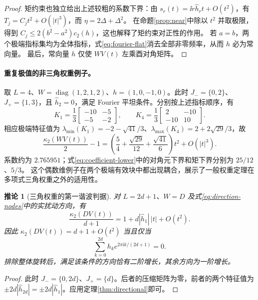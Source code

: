 \documentclass[UTF8,a4paper,zihao=-4,fontset=windows]{ctexart}
\theoremstyle{chinese}
\newtheorem{corollary}[theorem]{推论}
\numberwithin{equation}{section}
\newcommand{\diag}{\operatorname{diag}}
\newcommand{\cond}{\kappa_2}
\begin{document}
\begin{proof}
矩约束也独立给出上述较粗的系数下界：由 $s_r(t)=\ii r\widehat h_rt+O(t^2)$，有 $T_j=C_jt^2+O(|t|^3)$，而 $\eta=2\Delta+\Delta^2$。
在命题\ref{prop:near}中除以 $t^2$ 并取极限，得到 $C_j\le2(b^2-a^2)c_2(h)$，这也解释了矩约束对正性的作用。
若 $a=b$，两个极端指标集均为全体指标，式\eqref{eq:fourier-flat}消去全部非零频率，从而 $h$ 必为常向量。
最后，常向量 $h$ 仅使 $WV(t)$ 左乘酉对角矩阵。
\end{proof}


\paragraph{重复极值的非三角权重例子。}
取 $L=4$、$W=\diag(1,2,1,2)$、$h=(1,0,-1,0)$。此时 $J_-=\{0,2\}$、$J_+=\{1,3\}$，且 $\widehat h_2=0$，满足 Fourier 平坦条件。分别按上述指标顺序，有
\[
K_1=\frac13\begin{bmatrix}-10&-5\\-5&-2\end{bmatrix},\qquad
K_4=\frac13\begin{bmatrix}2&-10\\-10&10\end{bmatrix}.
\]
相应极端特征值为 $\lambda_{\min}(K_1)=-2-\sqrt{41}/3$、$\lambda_{\max}(K_4)=2+2\sqrt{29}/3$，故
\[
\frac{\cond(WV(t))}{2}-1=
\left(\frac54+\frac{\sqrt{29}}{12}+\frac{\sqrt{41}}6\right)t^2+O(|t|^3).
\]
系数约为 $2.765951$；式\eqref{eq:coefficient-lower}中的对角元下界和矩下界分别为 $25/12$、$5/3$。
这个偶数维例子在两个极端有效块中都出现耦合，展示了一般权重定理在多项式三角权重之外的适用性。

\begin{corollary}[三角权重的第一谐波判据]\label{cor:first-harmonic}
对 $L=2d+1$、$W=D$ 及式\eqref{eq:direction-nodes}中的实扰动方向，有
\begin{equation}\label{eq:first-harmonic}
\frac{\cond(DV(t))}{d+1}
=1+d|\widehat h_1|\,|t|+O(t^2).
\end{equation}
因此 $\cond(DV(t))=d+1+O(t^2)$ 当且仅当
\begin{equation}\label{eq:harmonic-criterion}
\sum_{k=0}^{2d}h_k e^{2\pi\mathrm i k/(2d+1)}=0.
\end{equation}
排除整体旋转后，满足该条件的方向恰有二阶增长，其余方向为一阶增长。
\end{corollary}
\begin{proof}
此时 $J_-=\{0,2d\}$、$J_+=\{d\}$。后者的压缩矩阵为零，前者的两个特征值为 $\pm2d|\widehat h_{2d}|=\pm2d|\widehat h_1|$。应用定理\ref{thm:directional}即可。
\end{proof}
\end{document}
